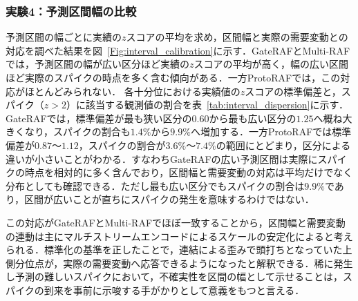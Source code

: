\documentclass[twocolumn, lastpage]{jarticle}
\newif\ifrevmark
\newcommand{\revB}[1]{\ifrevmark{\color{red}#1}\else#1\fi}
\begin{document}
\subsubsection{実験4：予測区間幅の比較}
予測区間の幅ごとに実績の$z$スコアの平均を求め，区間幅と実際の需要変動との対応を調べた結果を図~\ref{Fig:interval_calibration}に示す．GateRAFとMulti-RAFでは，予測区間の幅が広い区分ほど実績の$z$スコアの平均が高く，\revB{幅の広い区間ほど実際のスパイクの時点を多く含む傾向がある．}一方ProtoRAFでは，この対応がほとんどみられない．
\revB{各十分位における実績値の$z$スコアの標準偏差と，スパイク（$z>2$）に該当する観測値の割合を表~\ref{tab:interval_dispersion}に示す．GateRAFでは，標準偏差が最も狭い区分の$0.60$から最も広い区分の$1.25$へ概ね大きくなり，スパイクの割合も$1.4\%$から$9.9\%$へ増加する．一方ProtoRAFでは標準偏差が$0.87$〜$1.12$，スパイクの割合が$3.6\%$〜$7.4\%$の範囲にとどまり，区分による違いが小さいことがわかる．すなわちGateRAFの広い予測区間は実際にスパイクの時点を相対的に多く含んでおり，区間幅と需要変動の対応は平均だけでなく分布としても確認できる．ただし最も広い区分でもスパイクの割合は$9.9\%$であり，区間が広いことが直ちにスパイクの発生を意味するわけではない．}

この対応がGateRAFとMulti-RAFでほぼ一致することから，区間幅と需要変動の連動は主にマルチストリームエンコードによるスケールの安定化によると考えられる．標準化の基準を正したことで，連結による歪みで頭打ちとなっていた上側分位点が，実際の需要変動へ応答できるようになったと解釈できる．稀に発生し予測の難しいスパイクにおいて，不確実性を区間の幅として示せることは，スパイクの到来を事前に示唆する手がかりとして意義をもつと言える．
\end{document}
